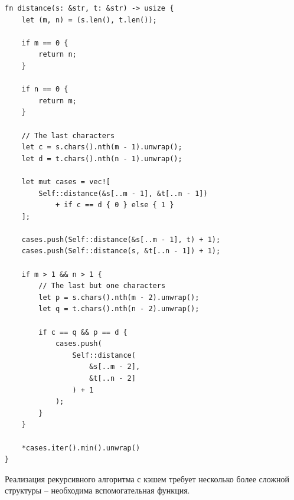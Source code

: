 \documentclass{report}
\begin{document}
\begin{lstlisting}[caption=Реализация простого рекурсивного алгоритма]
fn distance(s: &str, t: &str) -> usize {
    let (m, n) = (s.len(), t.len());

    if m == 0 {
        return n;
    }

    if n == 0 {
        return m;
    }

    // The last characters
    let c = s.chars().nth(m - 1).unwrap();
    let d = t.chars().nth(n - 1).unwrap();

    let mut cases = vec![
        Self::distance(&s[..m - 1], &t[..n - 1])
            + if c == d { 0 } else { 1 }
    ];

    cases.push(Self::distance(&s[..m - 1], t) + 1);
    cases.push(Self::distance(s, &t[..n - 1]) + 1);

    if m > 1 && n > 1 {
        // The last but one characters
        let p = s.chars().nth(m - 2).unwrap();
        let q = t.chars().nth(n - 2).unwrap();

        if c == q && p == d {
            cases.push(
                Self::distance(
                    &s[..m - 2],
                    &t[..n - 2]
                ) + 1
            );
        }
    }

    *cases.iter().min().unwrap()
}
\end{lstlisting}

Реализация рекурсивного алгоритма с кэшем требует несколько более
сложной структуры -- необходима вспомогательная функция.
\end{document}
